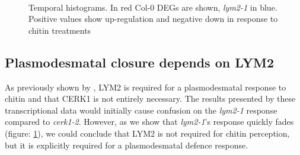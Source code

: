 \documentclass[../main.tex]{subfiles}
\begin{document}
\begin{figure}[!ht]
  \centering
  \\
  \caption[Temporal histograms of RNAseq data]{Temporal histograms. In red Col-0 DEGs are shown, \textit{lym2-1} in
    blue. Positive values show up-regulation and negative down in response to
    chitin treatments}
  \label{fig:tmpHist}
\end{figure}

\subsection{Plasmodesmatal closure depends on LYM2}
\label{sec:plasm-clos-depends}

As previously shown by \citet{Faulkner2013}, LYM2 is required for a
plasmodesmatal response to chitin and that CERK1 is not entirely necessary. The
results presented by these transcriptional data would initially cause confusion
on the \textit{lym2-1} response compared to \textit{cerk1-2}. However, as we
show that \textit{lym2-1}'s response quickly fades (figure: \ref{fig:tmpHist}),
we could conclude that LYM2 is not required for chitin perception, but it is
explicitly required for a plasmodesmatal defence response.
\end{document}
